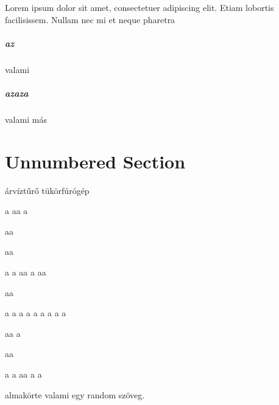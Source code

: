 \documentclass[12pt,oneside,justify]{book}
\begin{document}
Lorem ipsum dolor sit amet, consectetuer adipiscing elit.  
Etiam lobortis facilisissem.  Nullam nec mi et neque pharetra 
\paragraph{az}
valami 
\paragraph{azaza} 
valami más
 
\chapter{Unnumbered Section}
árvíztűrő tükörfúrógép

a
aa
a

aa

aa

a
a
aa
a
aa

aa

a
a
a
a
a
a
a
a
a

aa
a

aa

a
a
aa
a
a


almakörte valami egy random szöveg.
\end{document}
